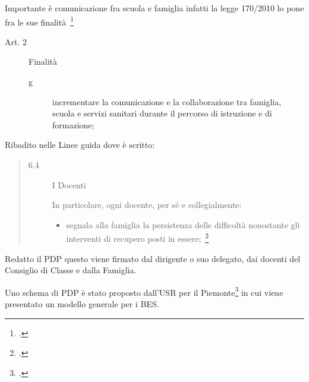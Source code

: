 Importante è comunicazione fra scuola e famiglia infatti la legge 170/2010 lo pone fra le sue finalità~\footcite{legge170}
\begin{description}
	\item[Art. 2] Finalità
	\begin{description}
		\item[g] incrementare la comunicazione e la collaborazione tra famiglia, scuola e servizi sanitari durante il percorso di istruzione e di formazione;
	\end{description}
\end{description}
Ribadito nelle Linee guida dove è scritto:
\begin{quote}
	\begin{description}
		\item[6.4] I Docenti
		
		In particolare, ogni docente, per sé e collegialmente:
		\begin{itemize}
			\item segnala alla famiglia la persistenza delle difficoltà nonostante gli interventi di recupero
			posti in essere;~\footcite{LineGuida2011}
		\end{itemize}
	\end{description}
\end{quote}
Redatto il PDP questo viene firmato dal dirigente o suo delegato, dai docenti del Consiglio di Classe e dalla Famiglia.

Uno schema di PDP è stato proposto dall'USR per il Piemonte\footcite{USRperilPiemonte2013a} in cui viene presentato un modello generale per i BES.

